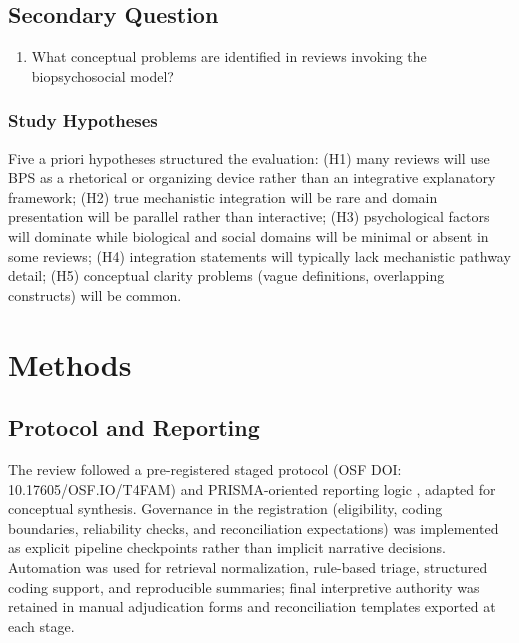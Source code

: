 \documentclass[11pt]{article}
\begin{document}
\subsection*{Secondary Question}
\begin{enumerate}[leftmargin=*, label=SRQ\arabic*., ref=SRQ\arabic*]
  \item \label{srq1} What conceptual problems are identified in reviews invoking the biopsychosocial model?
\end{enumerate}

\subsubsection*{Study Hypotheses}

Five a priori hypotheses structured the evaluation: (H1) many reviews will use BPS as a rhetorical or organizing device rather than an integrative explanatory framework; (H2) true mechanistic integration will be rare and domain presentation will be parallel rather than interactive; (H3) psychological factors will dominate while biological and social domains will be minimal or absent in some reviews; (H4) integration statements will typically lack mechanistic pathway detail; (H5) conceptual clarity problems (vague definitions, overlapping constructs) will be common.

\section{Methods}
\label{sec:methods}

\subsection{Protocol and Reporting}
The review followed a pre-registered staged protocol (OSF DOI: 10.17605/OSF.IO/T4FAM) and PRISMA-oriented reporting logic \citep{page2021, moher2009}, adapted for conceptual synthesis. Governance in the registration (eligibility, coding boundaries, reliability checks, and reconciliation expectations) was implemented as explicit pipeline checkpoints rather than implicit narrative decisions. Automation was used for retrieval normalization, rule-based triage, structured coding support, and reproducible summaries; final interpretive authority was retained in manual adjudication forms and reconciliation templates exported at each stage.
\end{document}
